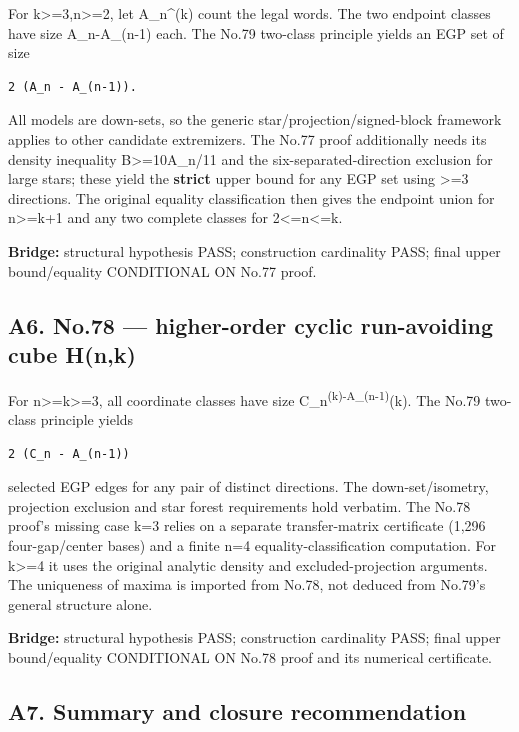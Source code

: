 \documentclass[
]{article}
\begin{document}
For k\textgreater=3,n\textgreater=2, let A\_n\^{}(k) count the legal
words. The two endpoint classes have size A\_n-A\_(n-1) each. The No.79
two-class principle yields an EGP set of size

\begin{verbatim}
2 (A_n - A_(n-1)).
\end{verbatim}

All models are down-sets, so the generic star/projection/signed-block
framework applies to other candidate extremizers. The No.77 proof
additionally needs its density inequality B\textgreater=10A\_n/11 and
the six-separated-direction exclusion for large stars; these yield the
\textbf{strict} upper bound for any EGP set using \textgreater=3
directions. The original equality classification then gives the endpoint
union for n\textgreater=k+1 and any two complete classes for
2\textless=n\textless=k.

\textbf{Bridge:} structural hypothesis PASS; construction cardinality
PASS; final upper bound/equality CONDITIONAL ON No.77 proof.

\subsection{A6. No.78 --- higher-order cyclic run-avoiding cube
H(n,k)}\label{a6.-no.78-higher-order-cyclic-run-avoiding-cube-hnk}

For n\textgreater=k\textgreater=3, all coordinate classes have size
C\_n\textsuperscript{(k)-A\_(n-1)}(k). The No.79 two-class principle
yields

\begin{verbatim}
2 (C_n - A_(n-1))
\end{verbatim}

selected EGP edges for any pair of distinct directions. The
down-set/isometry, projection exclusion and star forest requirements
hold verbatim. The No.78 proof's missing case k=3 relies on a separate
transfer-matrix certificate (1,296 four-gap/center bases) and a finite
n=4 equality-classification computation. For k\textgreater=4 it uses the
original analytic density and excluded-projection arguments. The
uniqueness of maxima is imported from No.78, not deduced from No.79's
general structure alone.

\textbf{Bridge:} structural hypothesis PASS; construction cardinality
PASS; final upper bound/equality CONDITIONAL ON No.78 proof and its
numerical certificate.

\subsection{A7. Summary and closure
recommendation}\label{a7.-summary-and-closure-recommendation}
\end{document}
